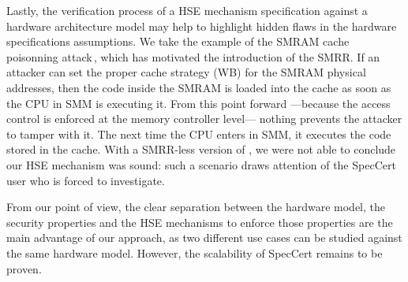 Lastly, the verification process of a HSE mechanism specification against a
hardware architecture model may help to highlight hidden flaws in the hardware
specifications assumptions. We take the example of the SMRAM cache poisonning
attack\,\cite{wojtczuk2009smram,duflot2009smram}, which has motivated the
introduction of the SMRR. If an attacker can set the proper cache strategy (WB)
for the SMRAM physical addresses, then the code inside the SMRAM is loaded into
the cache as soon as the CPU in SMM is executing it. From this point forward
---because the access control is enforced at the memory controller level---
nothing prevents the attacker to tamper with it. The next time the CPU enters in
SMM, it executes the code stored in the cache. With a SMRR-less version of
, we were not able to conclude our HSE mechanism was sound:
such a scenario draws attention of the SpecCert user who is forced to
investigate.

From our point of view, the clear separation between the hardware model, the
security properties and the HSE mechanisms to enforce those properties are the
main advantage of our approach, as two different use cases can be studied
against the same hardware model. However, the scalability of SpecCert remains to
be proven.